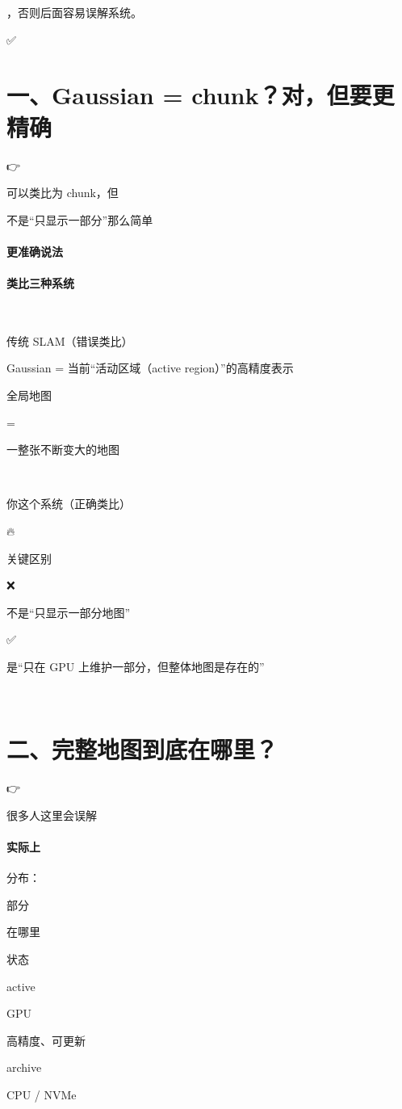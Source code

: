 \documentclass[12pt]{article}
\begin{document}
，否则后面容易误解系统。

✅

\section{一、Gaussian = chunk？对，但要更精确}
👉

可以类比为 chunk，但

不是“只显示一部分”那么简单

\paragraph{更准确说法}
\paragraph{类比三种系统}
🧱

传统 SLAM（错误类比）

Gaussian = 当前“活动区域（active region）”的高精度表示

全局地图

=

⼀整张不断变⼤的地图

🧩

你这个系统（正确类比）

🔥

关键区别

❌

不是“只显示一部分地图”

✅

是“只在 GPU 上维护一部分，但整体地图是存在的”

🧠

\section{二、完整地图到底在哪里？}
👉

很多人这里会误解

\paragraph{实际上}
分布：

部分

在哪里

状态

active

GPU

高精度、可更新

archive

CPU / NVMe
\end{document}
